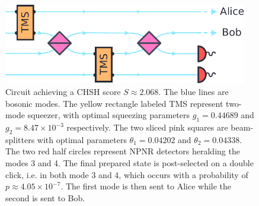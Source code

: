 \begin{figure}[ht]
	\begin{center}
		\includegraphics[width=0.95\textwidth]{chapters/deviceindependent/img/homodyne.pdf}
	\end{center}
	\caption{Circuit achieving a CHSH score $S\approx 2.068$. 
		The blue lines are bosonic modes. 
		The yellow rectangle labeled TMS represent two-mode squeezer, with optimal squeezing parameters $g_1=0.44689$ and $g_2=8.47\times 10^{-3}$ respectively. 
		The two sliced pink squares are beam-splitters with optimal parameters $\theta_1 = 0.04202$ and $\theta_2 = 0.04338$. 
		The two red half circles represent NPNR detectors heralding the modes 3 and 4. 
		The final prepared state is post-selected on a double click, i.e. in both mode 3 and 4, which occurs with a probability of $p\approx 4.05\times10^{-7}$. 
	The first mode is then sent to Alice while the second is sent to Bob.}
	\label{fig:homodyne}
\end{figure}



